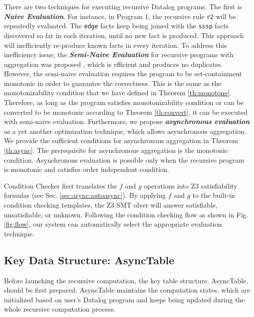 \documentclass{vldb}
\begin{document}
There are two techniques for executing recursive Datalog programs. The first is \emph{\textbf{Naive Evaluation}}. For instance, in Program 1, the recursive rule \texttt{r2} will be repeatedly evaluated. The \texttt{edge} facts keep being joined with the \texttt{sssp} facts discovered so far in each iteration, until no new fact is produced. This approach will inefficiently re-produce known facts in every iteration. To address this inefficiency issue, the \emph{\textbf{Semi-Naive Evaluation}} for recursive programs with aggregation was proposed \cite{Lam:2013:SDE:2510649.2511289,Wang:2015:AFR:2824032.2824052}, which is efficient and produces no duplicates. However, the semi-naive evaluation requires the program to be set-containment monotonic in order to guarantee the correctness. This is the same as the monotonizability condition that we have defined in Theorem \ref{th:monotone}. Therefore, as long as the program satisfies monotonizability condition or can be converted to be monotonic according to Theorem \ref{th:convert}, it can be executed with semi-naive evaluation. Furthermore, we propose \emph{\textbf{asynchronous evaluation}} as a yet another optimization technique, which allows asynchronous aggregation. We provide the sufficient conditions for asynchronous aggregation in Theorem \ref{th:async}. The prerequisite for asynchronous aggregation is the monotonic condition. Asynchronous evaluation is possible only when the recursive program is monotonic and satisfies order independent condition.

Condition Checker first translates the $f$ and $g$ operations into Z3 \cite{DeMoura:2008:ZES:1792734.1792766} satisfiability formulas (see Sec. \ref{sec:async:autoasync}). By applying $f$ and $g$ to the built-in condition checking templates, the Z3 SMT olver will answer satisfiable, unsatisfiable, or unknown. Following the condition checking flow as shown in Fig. \ref{fig:flow}, our system can automatically select the appropriate evaluation technique.

\subsection{Key Data Structure: AsyncTable}
\label{sec:system:data}

Before launching the recursive computation, the key table structure, AsyncTable, should be first prepared. AsyncTable maintains the computation states, which are initialized based on user's Datalog program and keeps being updated during the whole recursive computation process.
\end{document}
